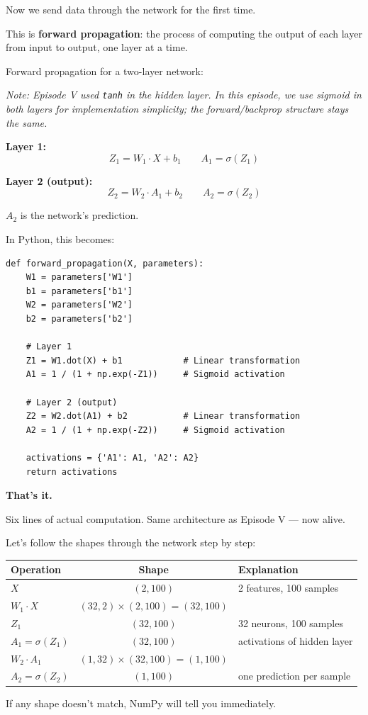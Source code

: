 \documentclass[11pt]{article}
\begin{document}
Now we send data through the network for the first time.

This is \textbf{forward propagation}: the process of computing the output of each layer from input to output, one layer at a time.

\begin{recapbox}[title=From Episode V]
Forward propagation for a two-layer network:

\textit{Note: Episode V used \texttt{tanh} in the hidden layer. In this episode, we use sigmoid in both layers for implementation simplicity; the forward/backprop structure stays the same.}

\textbf{Layer 1:}
\[
Z_1 = W_1 \cdot X + b_1 \qquad A_1 = \sigma(Z_1)
\]

\textbf{Layer 2 (output):}
\[
Z_2 = W_2 \cdot A_1 + b_2 \qquad A_2 = \sigma(Z_2)
\]

$A_2$ is the network's prediction.
\end{recapbox}

In Python, this becomes:

\begin{lstlisting}
def forward_propagation(X, parameters):
    W1 = parameters['W1']
    b1 = parameters['b1']
    W2 = parameters['W2']
    b2 = parameters['b2']

    # Layer 1
    Z1 = W1.dot(X) + b1            # Linear transformation
    A1 = 1 / (1 + np.exp(-Z1))     # Sigmoid activation

    # Layer 2 (output)
    Z2 = W2.dot(A1) + b2           # Linear transformation
    A2 = 1 / (1 + np.exp(-Z2))     # Sigmoid activation

    activations = {'A1': A1, 'A2': A2}
    return activations
\end{lstlisting}

\textbf{That's it.}

Six lines of actual computation. Same architecture as Episode V --- now alive.

\begin{insightbox}[title=Tracing the Dimensions]
Let's follow the shapes through the network step by step:
\begin{center}
\begin{tabular}{l c l}
\textbf{Operation} & \textbf{Shape} & \textbf{Explanation} \\
\hline
$X$ & $(2, 100)$ & 2 features, 100 samples \\
$W_1 \cdot X$ & $(32, 2) \times (2, 100) = (32, 100)$ & \\
$Z_1$ & $(32, 100)$ & 32 neurons, 100 samples \\
$A_1 = \sigma(Z_1)$ & $(32, 100)$ & activations of hidden layer \\
$W_2 \cdot A_1$ & $(1, 32) \times (32, 100) = (1, 100)$ & \\
$A_2 = \sigma(Z_2)$ & $(1, 100)$ & one prediction per sample \\
\end{tabular}
\end{center}

If any shape doesn't match, NumPy will tell you immediately.
\end{insightbox}
\end{document}
